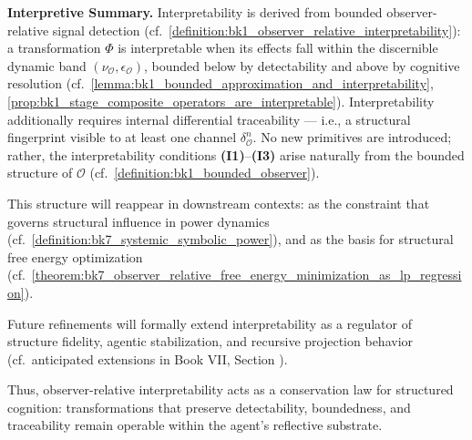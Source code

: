 \vspace{1em}
\noindent\textbf{Interpretive Summary.}  
Interpretability is derived from bounded observer-relative signal detection  
(cf.~\ref{definition:bk1_observer_relative_interpretability}):  
a transformation \(\Phi\) is interpretable when its effects fall within the  
discernible dynamic band \((\nu_{\mathcal{O}}, \epsilon_{\mathcal{O}})\),  
bounded below by detectability and above by cognitive resolution  
(cf.~\ref{lemma:bk1_bounded_approximation_and_interpretability},  
\ref{prop:bk1_stage_composite_operators_are_interpretable}).  
Interpretability additionally requires internal differential traceability —  
i.e., a structural fingerprint visible to at least one channel \(\delta^n_{\mathcal{O}}\).  
No new primitives are introduced; rather, the interpretability conditions  
\textbf{(I1)}–\textbf{(I3)} arise naturally from the bounded structure of \(\mathcal{O}\)  
(cf.~\ref{definition:bk1_bounded_observer}).

This structure will reappear in downstream contexts:  
as the constraint that governs structural influence in power dynamics  
(cf.~\ref{definition:bk7_systemic_symbolic_power}),  
and as the basis for structural free energy optimization  
(cf.~\ref{theorem:bk7_observer_relative_free_energy_minimization_as_lp_regression}).

Future refinements will formally extend interpretability  
as a regulator of structure fidelity, agentic stabilization, and recursive projection behavior  
(cf.~anticipated extensions in Book VII, Section \texttt{}).  

Thus, observer-relative interpretability acts as a conservation law  
for structured cognition: transformations that preserve detectability,  
boundedness, and traceability remain operable within the agent’s reflective substrate.

